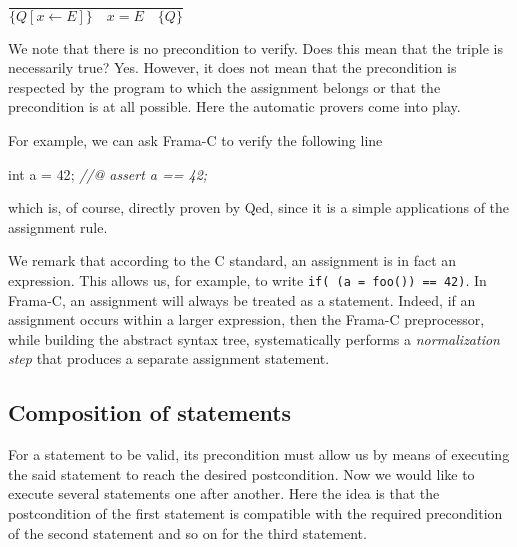 \documentclass[12pt,francais,]{scrbook}
\newenvironment{Shaded}{}{}
\newcommand{\DataTypeTok}[1]{\textcolor[rgb]{0.56,0.13,0.00}{{#1}}}
\newcommand{\DecValTok}[1]{\textcolor[rgb]{0.25,0.63,0.44}{{#1}}}
\newcommand{\CommentTok}[1]{\textcolor[rgb]{0.38,0.63,0.69}{\textit{{#1}}}}
\newcommand{\NormalTok}[1]{{#1}}
\newenvironment{zdsblock}[1]{%
  \tcolorbox[beamer,%
    noparskip,breakable,
    colback=LightBlue,colframe=DarkBlue,%
    colbacklower=DarkBlue,%
    title=#1]
}{\endtcolorbox}
\begin{document}
\begin{center}
\(\dfrac{}{\{Q[x \leftarrow E] \}\quad x = E \quad\{ Q \}}\)
\end{center}

We note that there is no precondition to verify. Does this mean that the
triple is necessarily true? Yes. However, it does not mean that the
precondition is respected by the program to which the assignment belongs
or that the precondition is at all possible. Here the automatic provers
come into play.

For example, we can ask Frama-C to verify the following line

\begin{footnotesize}\begin{Shaded}
\begin{Highlighting}[]
\DataTypeTok{int} \NormalTok{a = }\DecValTok{42}\NormalTok{;}
\CommentTok{//@ assert a == 42;}
\end{Highlighting}
\end{Shaded}\end{footnotesize}

which is, of course, directly proven by Qed, since it is a simple
applications of the assignment rule.

\begin{zdsblock}{Information}
  We remark that according to the C standard, an assignment is in fact an
  expression. This allows us, for example, to write
  \texttt{if(\ (a\ =\ foo())\ ==\ 42)}.
  In Frama-C, an assignment will always be treated as a statement. Indeed,
  if an assignment occurs within a larger expression, then the Frama-C
  preprocessor, while building the abstract syntax tree, systematically
  performs a \emph{normalization step} that produces a separate assignment
  statement.
\end{zdsblock}

\subsection{Composition of statements}\label{composition-of-statements}

For a statement to be valid, its precondition must allow us by means of
executing the said statement to reach the desired postcondition. Now we
would like to execute several statements one after another. Here the
idea is that the postcondition of the first statement is compatible with
the required precondition of the second statement and so on for the
third statement.
\end{document}
